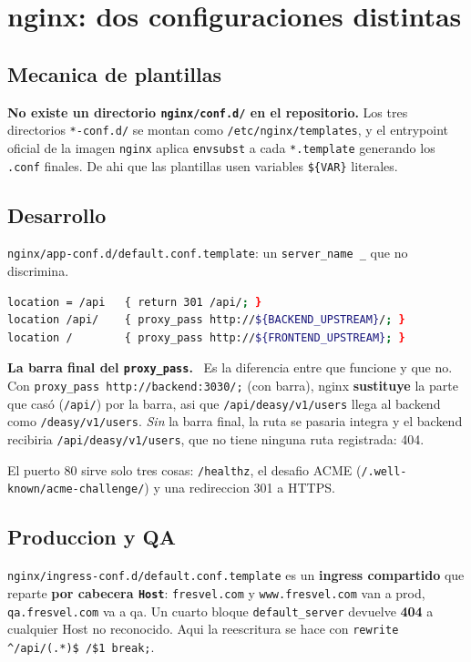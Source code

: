\documentclass[11pt,a4paper,oneside]{report}
\newenvironment{concepto}[1][Concepto para juniors]{%
  \par\medskip
  \colorlet{shadecolor}{blue!7}%
  \begin{shaded}\noindent\textbf{\color{blue!55!black}#1.}\ \ignorespaces}%
  {\end{shaded}\par\medskip}
\newcommand{\rt}[1]{\texttt{#1}}
\begin{document}
\section{nginx: dos configuraciones distintas}

\subsection{Mecanica de plantillas}

\textbf{No existe un directorio \rt{nginx/conf.d/} en el repositorio.} Los tres directorios
\rt{*-conf.d/} se montan como \rt{/etc/nginx/templates}, y el entrypoint oficial de la imagen
\rt{nginx} aplica \rt{envsubst} a cada \rt{*.template} generando los \rt{.conf} finales. De ahi
que las plantillas usen variables \rt{\$\{VAR\}} literales.

\subsection{Desarrollo}

\rt{nginx/app-conf.d/default.conf.template}: un \rt{server\_name \_} que no discrimina.

\begin{lstlisting}[language=bash]
location = /api   { return 301 /api/; }
location /api/    { proxy_pass http://${BACKEND_UPSTREAM}/; }
location /        { proxy_pass http://${FRONTEND_UPSTREAM}; }
\end{lstlisting}

\begin{concepto}[La barra final del \rt{proxy\_pass}]
Es la diferencia entre que funcione y que no. Con \rt{proxy\_pass http://backend:3030/;} (con
barra), nginx \textbf{sustituye} la parte que casó (\rt{/api/}) por la barra, asi que
\rt{/api/deasy/v1/users} llega al backend como \rt{/deasy/v1/users}. \emph{Sin} la barra final,
la ruta se pasaria integra y el backend recibiria \rt{/api/deasy/v1/users}, que no tiene
ninguna ruta registrada: 404.
\end{concepto}

El puerto 80 sirve solo tres cosas: \rt{/healthz}, el desafio ACME
(\rt{/.well-known/acme-challenge/}) y una redireccion 301 a HTTPS.

\subsection{Produccion y QA}

\rt{nginx/ingress-conf.d/default.conf.template} es un \textbf{ingress compartido} que reparte
\textbf{por cabecera \rt{Host}}: \rt{fresvel.com} y \rt{www.fresvel.com} van a prod,
\rt{qa.fresvel.com} va a qa. Un cuarto bloque \rt{default\_server} devuelve \textbf{404} a
cualquier Host no reconocido. Aqui la reescritura se hace con
\rt{rewrite \^{}/api/(.*)\$ /\$1 break;}.
\end{document}
